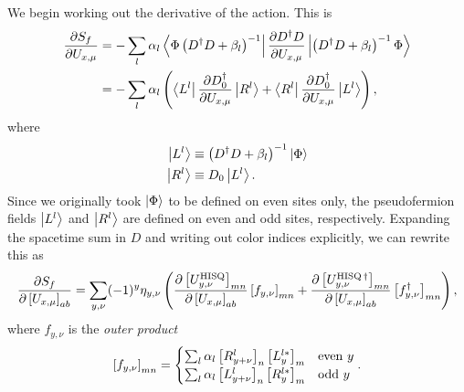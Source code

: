 We begin working out the derivative of the action. This is
\begin{equation}\begin{aligned}
\pdv{S_f}{U_{x,\mu}} &=
-\sum_l\alpha_l
\bra{\Phi\left(D^\dagger D+\beta_l\right)^{-1}}
\pdv{D^\dagger D}{U_{x,\mu}}
\ket{\left(D^\dagger D+\beta_l\right)^{-1}\Phi}\\
&=-\sum_l\alpha_l\left(
\bra{L^l}\pdv{D_0^\dagger}{U_{x,\mu}}\ket{R^l} +
\bra{R^l}\pdv{D_0^\dagger}{U_{x,\mu}}\ket{L^l}\right),
\end{aligned}\end{equation}
where
\begin{equation}\begin{aligned}
\ket{L^l}&\equiv\left(D^\dagger D+\beta_l\right)^{-1}\ket{\Phi}\\
\ket{R^l}&\equiv D_0\ket{L^l}.
\end{aligned}\end{equation}
Since we originally took $\ket{\Phi}$ to be defined on even sites only,
the pseudofermion fields $\ket{L^l}$ and $\ket{R^l}$ are defined on
even and odd sites, respectively. Expanding the spacetime sum in $D$ and writing
out color indices explicitly, we can rewrite this as
\begin{equation}
\pdv{S_f}{\left[U_{x,\mu}\right]_{ab}}=
\sum_{y,\nu}(-1)^y\eta_{y,\nu}\left(
\pdv{\left[U_{y,\nu}^{\rm HISQ}\right]_{mn}}{\left[U_{x,\mu}\right]_{ab}}
\left[f_{y,\nu}\right]_{mn}+
\pdv{\left[U_{y,\nu}^{\rm HISQ\,\dagger}\right]_{mn}}{\left[U_{x,\mu}\right]_{ab}}
\left[f^\dagger_{y,\nu}\right]_{mn}
\right),
\end{equation}
where $f_{y,\nu}$ is the {\it outer product}
\begin{equation}\label{eq:HISQouterproduct}
\left[f_{y,\nu}\right]_{mn}=
\begin{cases}
\sum_l\alpha_l\left[R^l_{y+\nu}\right]_n\left[L^{l*}_y\right]_m & {\rm even}~y\\
\sum_l\alpha_l\left[L^l_{y+\nu}\right]_n\left[R^{l*}_y\right]_m & {\rm odd}~y\\
\end{cases}.
\end{equation}

